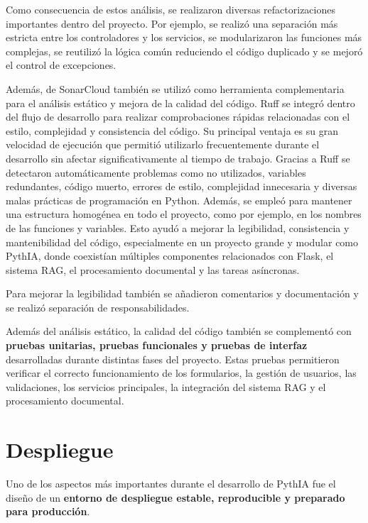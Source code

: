 Como consecuencia de estos análisis, se realizaron diversas refactorizaciones importantes dentro del proyecto. Por ejemplo, se realizó una separación más estricta entre los controladores y los servicios, se modularizaron las funciones más complejas, se reutilizó la lógica común reduciendo el código duplicado y se mejoró el control de excepciones.

Además, de SonarCloud también se utilizó  como herramienta complementaria para el análisis estático y mejora de la calidad del código. Ruff se integró dentro del flujo de desarrollo para realizar comprobaciones rápidas relacionadas con el estilo, complejidad y consistencia del código. Su principal ventaja es su gran velocidad de ejecución que permitió utilizarlo frecuentemente durante el desarrollo sin afectar significativamente al tiempo de trabajo. Gracias a Ruff se detectaron automáticamente problemas como  no utilizados, variables redundantes, código muerto, errores de estilo, complejidad innecesaria y diversas malas prácticas de programación en Python. Además, se empleó para mantener una estructura homogénea en todo el proyecto, como por ejemplo, en los nombres de las funciones y variables. Esto ayudó a mejorar la legibilidad, consistencia y mantenibilidad del código, especialmente en un proyecto grande y modular como PythIA, donde coexistían múltiples componentes relacionados con Flask, el sistema RAG, el procesamiento documental y las tareas asíncronas.

 Para mejorar la legibilidad también se añadieron comentarios y documentación y se realizó separación de responsabilidades.

Además del análisis estático, la calidad del código también se complementó con \textbf{pruebas unitarias, pruebas funcionales y pruebas de interfaz} desarrolladas durante distintas fases del proyecto. Estas pruebas permitieron verificar el correcto funcionamiento de los formularios, la gestión de usuarios, las validaciones, los servicios principales, la integración del sistema RAG y el procesamiento documental. 

\section{Despliegue}

Uno de los aspectos más importantes durante el desarrollo de PythIA fue el diseño de un \textbf{entorno de despliegue estable, reproducible y preparado para producción}.

